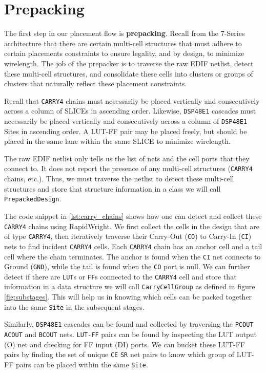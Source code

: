 


\section{Prepacking}
\label{sec:prepacking}


The first step in our placement flow is \textbf{prepacking}. 
Recall from the 7-Series architecture that there are certain multi-cell structures that must adhere to certain placements constraints to ensure legality, and by design, to minimize wirelength. 
The job of the prepacker is to traverse the raw EDIF netlist, detect these multi-cell structures, and consolidate these cells into clusters or groups of clusters that naturally reflect these placement constraints. 

Recall that \texttt{CARRY4} chains must necessarily be placed vertically and consecutively across a column of SLICEs in ascending order. 
Likewise, \texttt{DSP48E1} cascades must necessarily be placed vertically and consecutively across a column of \texttt{DSP48E1} Sites in ascending order. 
A LUT-FF pair may be placed freely, but should be placed in the same lane within the same SLICE to minimize wirelength.

The raw EDIF netlist only tells us the list of nets and the cell ports that they connect to. 
It does not report the presence of any multi-cell structures (\texttt{CARRY4} chains, etc.). 
Thus, we must traverse the netlist to detect these multi-cell structures and store that structure information in a class we will call \texttt{PrepackedDesign}.

The code snippet in \ref{lst:carry_chains} shows how one can detect and collect these \texttt{CARRY4} chains using RapidWright. 
We first collect the cells in the design that are of type \texttt{CARRY4}, then iteratively traverse their Carry-Out (\texttt{CO}) to Carry-In (\texttt{CI}) nets to find incident \texttt{CARRY4} cells.
Each \texttt{CARRY4} chain has an anchor cell and a tail cell where the chain terminates.
The anchor is found when the \texttt{CI} net connects to Ground (\texttt{GND}), while the tail is found when the \texttt{CO} port is null. 
We can further detect if there are \texttt{LUT}s or \texttt{FF}s connected to the \texttt{CARRY4} cell and store that information in a data structure we will call \texttt{CarryCellGroup} as defined in figure \ref{fig:substages}.
This will help us in knowing which cells can be packed together into the same \texttt{Site} in the subsequent stages. 

Similarly, \texttt{DSP48E1} cascades can be found and collected by traversing the \texttt{PCOUT} \texttt{ACOUT} and \texttt{BCOUT} nets.
\texttt{LUT-FF} pairs can be found by inspecting the LUT output (O) net and checking for FF input (DI) ports. 
We can bucket these LUT-FF pairs by finding the set of unique \texttt{CE} \texttt{SR} net pairs to know which group of LUT-FF pairs can be placed within the same \texttt{Site}. 

